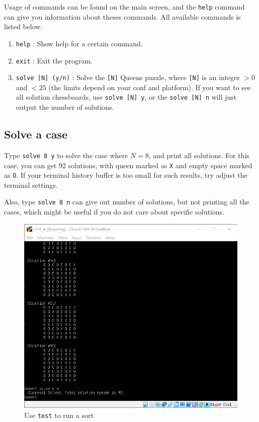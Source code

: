 \documentclass[cn,black,12pt,normal]{elegantnote}
\begin{document}
Usage of commands can be found on the main screen, and the \lstinline{help} command can give you information about theses commands.  All available commands is listed below.

\begin{enumerate}
    \item \lstinline{help} : Show help for a certain command.
    \item \lstinline{exit} : Exit the program.
    \item \lstinline{solve [N] (y/n)} : Solve the \lstinline{[N]} Queens puzzle, where \lstinline{[N]} is an integer $> 0$ and $< 25$ (the limits depend on your conf and platform). If you want to see all solution chessboards, use \lstinline{solve [N] y}, or the \lstinline{solve [N] n} will just output the number of solutions.
\end{enumerate}

\subsection{Solve a case}

Type \lstinline{solve 8 y} to solve the case where $N=8$, and print all solutions. For this case, you can get 92 solutions, with queen marked as \lstinline{X} and empty space marked as \lstinline{O}. If your terminal history buffer is too small for such results, try adjust the terminal settings.

Also, type \lstinline{solve 8 n} can give out number of solutions, but not printing all the cases, which might be useful if you do not care about specific solutions.

\begin{figure}[H]
    \centering
    \includegraphics[width=0.7\linewidth]{image/queen_02.jpg}
    \caption{Use \lstinline{test} to run a sort}
\end{figure}
\end{document}
